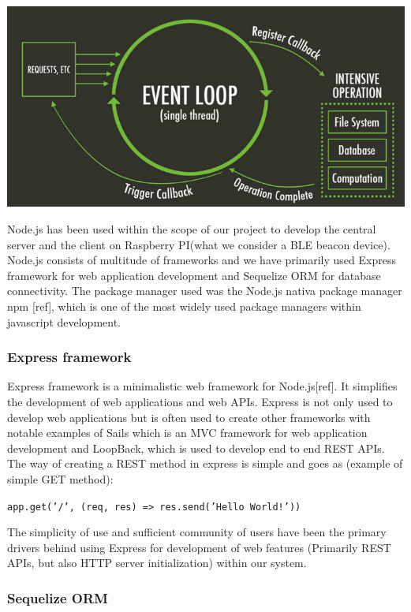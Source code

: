 \bigskip
\includegraphics[scale=0.3]{gfx/node} 
\bigskip

Node.js has been used within the scope of our project to develop the central server and the client on Raspberry PI(what we consider a BLE beacon device). Node.js consists of multitude of frameworks and we have primarily used Express framework for web application development and Sequelize ORM for database connectivity. The package manager used was the Node.js nativa package manager npm [ref], which is one of the most widely used package managers within javascript development.

\subsubsection{Express framework}
\label{subsubsec:express}

Express framework is a minimalistic web framework for Node.js[ref]. It simplifies the development of web applications and web APIs. Express is not only used to develop web applications but is often used to create other frameworks with notable examples of Sails which is an MVC framework for web application development and LoopBack, which is used to develop end to end REST APIs. The way of creating a REST method in express is simple and goes as (example of simple GET method):\newline 

\smallskip
{\tt app.get('/', (req, res) => res.send('Hello World!'))}
\newline
\smallskip

The simplicity of use and sufficient community of users have been the primary drivers behind using Express for development of web features (Primarily REST APIs, but also HTTP server initialization) within our system.

\subsubsection{Sequelize ORM}
\label{subsubsec:sequelize}


